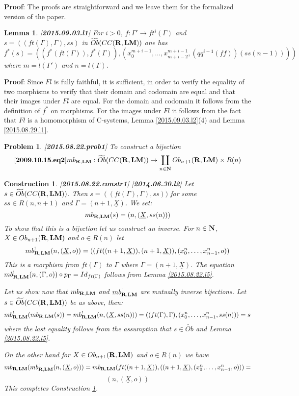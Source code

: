 \documentclass[11pt]{article}
\newenvironment{eq}{\begin{equation}}{\end{equation}}
\newenvironment{proof}{{\bf Proof}:}{\vskip 5mm }
\newtheorem{lemma}[proposition]{Lemma}
\newtheorem{problem}[proposition]{Problem}
\newtheorem{construction}[proposition]{Construction}
\newcommand{\llabel}[1]{\label{#1}[{\bf #1}]}
\newcommand{\sr}{\rightarrow}
\newcommand{\nn}{{\bf N\rm}}
\newcommand{\nat}{\nn}
\newcommand{\rr}{{\bf R}}
\newcommand{\lm}{{\bf LM}}
\newcommand{\uu}{\underline}
\newcommand{\wt}{\widetilde}
\begin{document}
%
\begin{proof}
The proofs are straightforward and we leave them for the formalized version of the paper.
\end{proof}
%
\begin{lemma}
\llabel{2015.09.03.l1}
For $i>0$, $f:\Gamma'\sr ft^i(\Gamma)$ and $s=((ft(\Gamma),\Gamma),ss)$ in $\wt{Ob}(CC(\rr,\lm))$ one has
%
$$f^*(s)=((f^*(ft(\Gamma)),f^*(\Gamma)),(x_0^{m+i-1},\dots,x_{m+i-2}^{m+i-1},(qq^{i-1}(ff))(ss(n-1))))$$
%
where $m=l(\Gamma')$ and $n=l(\Gamma)$.
\end{lemma}
%
\begin{proof}
Since $Fl$ is fully faithful, it is sufficient, in order to verify the equality of two morphisms to verify that their domain and codomain are equal and that their images under $Fl$ are equal. For the domain and codomain it follows from the definition of $f^*$ on morphisms. For the images under $Fl$ it follows from the fact that $Fl$ is a homomorphism of C-systems, Lemma \ref{2015.09.03.l2}(4) and
Lemma \ref{2015.08.29.l1}. 
\end{proof}
%
\begin{problem}
\llabel{2015.08.22.prob1}
To construct a bijection
%
\begin{eq}
\llabel{2009.10.15.eq2}
mb_{\rr,\lm}:\wt{Ob}(CC(\rr,\lm))\sr \coprod_{n\in\nat} Ob_{n+1}(\rr,\lm)\times R(n)
\end{eq}
%
\end{problem}
%
\begin{construction}\rm
\llabel{2015.08.22.constr1}
\llabel{2014.06.30.l2}
Let $s\in \wt{Ob}(CC(\rr,\lm))$. Then $s=((ft(\Gamma),\Gamma),ss))$ for some $ss\in R(n,n+1)$ and $\Gamma=(n+1,\uu{X})$. We set:
%
$$mb_{\rr,\lm}(s)=(n, (\uu{X}, ss(n)))$$
%
To show that this is a bijection let us construct an inverse. For $n\in\nat$, $X\in Ob_{n+1}(\rr,\lm)$ and $o\in R(n)$ let
%
$$mb_{\rr,\lm}^!(n,(\uu{X},o))=((ft((n+1,\uu{X})),(n+1,\uu{X})),(x^{n}_0,\dots,x^{n}_{n-1},o))$$
%
This is a morphism from $ft(\Gamma)$ to $\Gamma$ where $\Gamma=(n+1,\uu{X})$. The equation $mb_{\rr,\lm}^!(n,(\Gamma,o))\circ p_\Gamma=Id_{ft(\Gamma)}$ follows from Lemma \ref{2015.08.22.l5}. 

Let us show now that $mb_{\rr,\lm}$ and $mb_{\rr,\lm}^!$ are mutually inverse bijections. Let $s\in \wt{Ob}(CC(\rr,\lm))$ be as above, then:
%
$$mb_{\rr,\lm}^!(mb_{\rr,\lm}(s))=mb_{\rr,\lm}^!(n,(\uu{X},ss(n)))=((ft(\Gamma),\Gamma),(x^{n}_0,\dots,x^{n}_{n-1},ss(n)))=s$$
%
where the last equality follows from the assumption that $s\in \wt{Ob}$ and Lemma \ref{2015.08.22.l5}.

On the other hand for $X\in Ob_{n+1}(\rr,\lm)$ and $o\in R(n)$ we have
%
$$mb_{\rr,\lm}(mb_{\rr,\lm}^!(n,(\uu{X},o)))=mb_{\rr,\lm}(ft((n+1,\uu{X})),((n+1,\uu{X}),(x^{n}_0,\dots,x^{n}_{n-1},o)))=$$
$$(n,(\uu{X},o))$$
%
This completes Construction \ref{2015.08.22.constr1}.
\end{construction}
\end{document}
